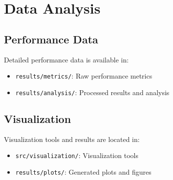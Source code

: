 \documentclass[12pt]{article}
\begin{document}
\section{Data Analysis}
\subsection{Performance Data}
Detailed performance data is available in:
\begin{itemize}[noitemsep]
    \item \texttt{results/metrics/}: Raw performance metrics
    \item \texttt{results/analysis/}: Processed results and analysis
\end{itemize}

\subsection{Visualization}
Visualization tools and results are located in:
\begin{itemize}[noitemsep]
    \item \texttt{src/visualization/}: Visualization tools
    \item \texttt{results/plots/}: Generated plots and figures
\end{itemize}
\end{document}
